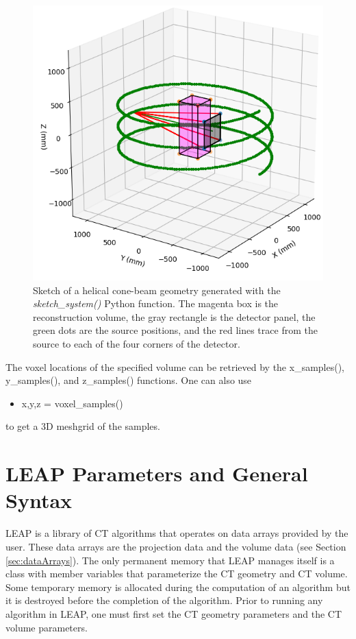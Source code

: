 \documentclass[11pt]{article}
\begin{document}
\begin{figure}[h!]
\begin{center}
\includegraphics[scale=0.5]{helical}
\end{center}
\vspace{-20pt}\caption{Sketch of a helical cone-beam geometry generated with the \textit{sketch\_system()} Python function.  The  magenta box is the reconstruction volume, the gray rectangle is the detector panel, the green dots are the source positions, and the red lines trace from the source to each of the four corners of the detector.} \label{fig:helicalSketch}
\end{figure}

The voxel locations of the specified volume can be retrieved by the x\_samples(), y\_samples(), and z\_samples() functions.  One can also use
\begin{itemize}
    \item[] x,y,z = voxel\_samples()
\end{itemize}
to get a 3D meshgrid of the samples.

\section{LEAP Parameters and General Syntax}

LEAP is a library of CT algorithms that operates on data arrays provided by the user.  These data arrays are the projection data and the volume data (see Section \ref{sec:dataArrays}).  The only permanent memory that LEAP manages itself is a class with member variables that parameterize the CT geometry and CT volume.  Some temporary memory is allocated during the computation of an algorithm but it is destroyed before the completion of the algorithm.  Prior to running any algorithm in LEAP, one must first set the CT geometry parameters and the CT volume parameters.
\end{document}
